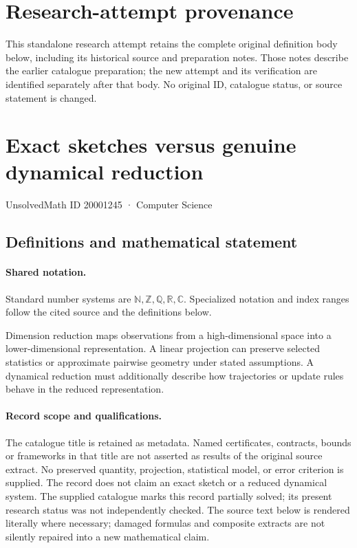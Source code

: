 \documentclass[11pt]{article}
\begin{document}
\section*{Research-attempt provenance}
This standalone research attempt retains the complete original definition body below,
including its historical source and preparation notes. Those notes describe the
earlier catalogue preparation; the new attempt and its verification are identified
separately after that body. No original ID, catalogue status, or source statement is changed.

\section{Exact sketches versus genuine dynamical reduction}\label{20001245}
{\small UnsolvedMath ID 20001245 · Computer Science}
\subsection{Definitions and mathematical statement}

\paragraph{Shared notation.}Standard number systems are $\mathbb N,\mathbb Z,\mathbb Q,\mathbb R,\mathbb C$. Specialized notation and index ranges follow the cited source and the definitions below.


Dimension reduction maps observations from a high-dimensional space into a lower-dimensional representation. A linear projection can preserve selected statistics or approximate pairwise geometry under stated assumptions. A dynamical reduction must additionally describe how trajectories or update rules behave in the reduced representation.
\paragraph{Record scope and qualifications.}
The catalogue title is retained as metadata. Named certificates, contracts, bounds or frameworks in that title are not asserted as results of the original source extract.
No preserved quantity, projection, statistical model, or error criterion is supplied. The record does not claim an exact sketch or a reduced dynamical system. The supplied catalogue marks this record partially solved; its present research status was not independently checked.
The source text below is rendered literally where necessary; damaged formulas and composite extracts are not silently repaired into a new mathematical claim.
\end{document}
